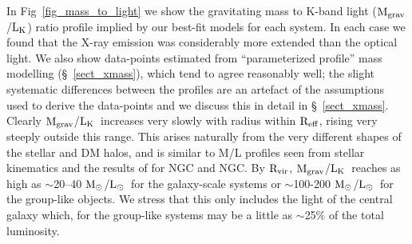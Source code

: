 \documentclass{emulateapj}
\def \msun {${\rm M_\odot}$}
\newcommand{\reff}{${\rm R_{eff}}$}
\newcommand{\mgrav}{${\rm M_{grav}}$}
\newcommand{\lk }{${\rm L_K}$}
\newcommand{\rvir }{${\rm R_{vir}}$}
\newcommand{\lsun }{${\rm L_\odot}$}
\newcommand{\thin}{\thinspace}
\begin{document}
In Fig~\ref{fig_mass_to_light}
we show the gravitating mass to K-band light (\mgrav/\lk) ratio profile
implied by our best-fit models for each system.
In each case we found that the X-ray emission was considerably
more extended than the optical light.
We also show data-points estimated from ``parameterized profile''
mass modelling (\S~\ref{sect_xmass}),
which tend to agree reasonably well; the slight systematic 
differences between the profiles are an artefact of the assumptions used
to derive the data-points and we discuss this in detail in \S~\ref{sect_xmass}.
Clearly \mgrav/\lk\ increases
very slowly with radius within \reff, rising very steeply outside this 
range. This arises naturally from the very different shapes of the stellar
and DM halos, and is similar to M/L profiles seen from stellar 
kinematics and the results of  \citet{brighenti97a} for NGC\thin 4472
and NGC\thin 4649.
By \rvir, \mgrav/\lk\ reaches as high as $\sim$20--40 
\msun/\lsun\ for the galaxy-scale systems or 
$\sim$100-200 \msun/\lsun\ for the group-like objects. We stress
that this only includes the light of the central galaxy which,
for the group-like systems may be a little as $\sim$25\% of the total
luminosity.
\end{document}

